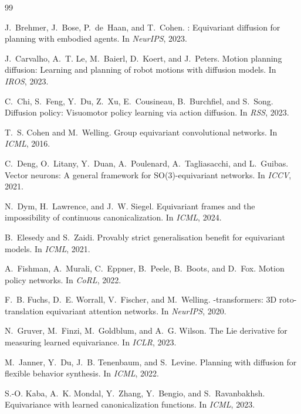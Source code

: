 \documentclass[conference]{IEEEtran}
\begin{document}
\small
\begin{thebibliography}{99}

J.~Brehmer, J.~Bose, P.~de~Haan, and T.~Cohen.
: Equivariant diffusion for planning with embodied agents.
\newblock In {\em NeurIPS}, 2023.

J.~Carvalho, A.~T. Le, M.~Baierl, D.~Koert, and J.~Peters.
\newblock Motion planning diffusion: Learning and planning of robot motions with
  diffusion models.
\newblock In {\em IROS}, 2023.

C.~Chi, S.~Feng, Y.~Du, Z.~Xu, E.~Cousineau, B.~Burchfiel, and S.~Song.
\newblock Diffusion policy: Visuomotor policy learning via action diffusion.
\newblock In {\em RSS}, 2023.

T.~S. Cohen and M.~Welling.
\newblock Group equivariant convolutional networks.
\newblock In {\em ICML}, 2016.

C.~Deng, O.~Litany, Y.~Duan, A.~Poulenard, A.~Tagliasacchi, and L.~Guibas.
\newblock Vector neurons: A general framework for {SO(3)}-equivariant networks.
\newblock In {\em ICCV}, 2021.

N.~Dym, H.~Lawrence, and J.~W. Siegel.
\newblock Equivariant frames and the impossibility of continuous
  canonicalization.
\newblock In {\em ICML}, 2024.

B.~Elesedy and S.~Zaidi.
\newblock Provably strict generalisation benefit for equivariant models.
\newblock In {\em ICML}, 2021.

A.~Fishman, A.~Murali, C.~Eppner, B.~Peele, B.~Boots, and D.~Fox.
\newblock Motion policy networks.
\newblock In {\em CoRL}, 2022.

F.~B. Fuchs, D.~E. Worrall, V.~Fischer, and M.~Welling.
-transformers: 3{D} roto-translation equivariant attention
  networks.
\newblock In {\em NeurIPS}, 2020.

N.~Gruver, M.~Finzi, M.~Goldblum, and A.~G. Wilson.
\newblock The {L}ie derivative for measuring learned equivariance.
\newblock In {\em ICLR}, 2023.

M.~Janner, Y.~Du, J.~B. Tenenbaum, and S.~Levine.
\newblock Planning with diffusion for flexible behavior synthesis.
\newblock In {\em ICML}, 2022.

S.-O. Kaba, A.~K. Mondal, Y.~Zhang, Y.~Bengio, and S.~Ravanbakhsh.
\newblock Equivariance with learned canonicalization functions.
\newblock In {\em ICML}, 2023.


\end{thebibliography}
\end{document}
